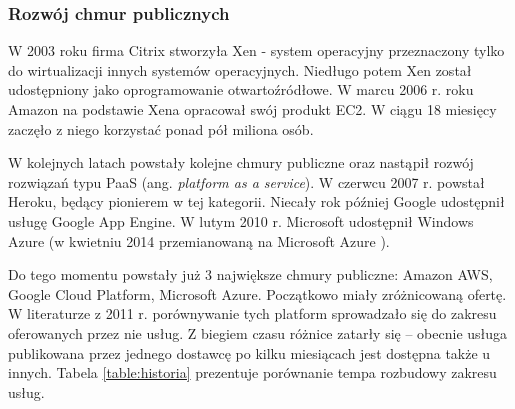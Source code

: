 \documentclass[12pt,a4paper,twoside,titlepage,openright]{book}
\begin{document}
\subsubsection*{Rozwój chmur publicznych}

W 2003 roku firma Citrix stworzyła Xen - system operacyjny przeznaczony tylko do wirtualizacji innych systemów operacyjnych. Niedługo potem Xen został udostępniony jako oprogramowanie otwartoźródłowe. W marcu 2006 r. roku Amazon na podstawie Xena opracował swój produkt EC2. W ciągu 18 miesięcy zaczęło z niego korzystać ponad pół miliona osób.\cite{ccBiznes}

W kolejnych latach powstały kolejne chmury publiczne oraz nastąpił rozwój rozwiązań typu PaaS (ang. \textit{platform as a service}). W czerwcu 2007 r. powstał Heroku, będący pionierem w tej kategorii. Niecały rok później Google udostępnił usługę Google App Engine. W lutym 2010 r. Microsoft udostępnił Windows Azure (w kwietniu 2014 przemianowaną na Microsoft Azure \cite{azurePackt}).

Do tego momentu powstały już 3 największe chmury publiczne: Amazon AWS, Google Cloud Platform, Microsoft Azure. Początkowo miały zróżnicowaną ofertę. W literaturze\cite{ccBiznes} z 2011 r. porównywanie tych platform sprowadzało się do zakresu oferowanych przez nie usług. Z biegiem czasu różnice zatarły się -- obecnie usługa publikowana przez jednego dostawcę po kilku miesiącach jest dostępna także u innych. Tabela \ref{table:historia} prezentuje porównanie tempa rozbudowy zakresu usług.
\end{document}
